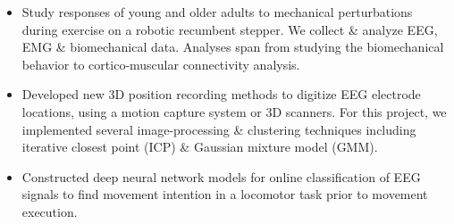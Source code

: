 \documentclass[10pt,letter,ragged2e]{altacv}
\begin{document}

\begin{fullwidth}
\makecvheader
\end{fullwidth}



\begin{itemize}
\item Study responses of young and older adults to mechanical perturbations during exercise on a robotic recumbent stepper. We collect \& analyze EEG, EMG \& biomechanical data. Analyses span from studying the biomechanical behavior to cortico-muscular connectivity analysis.
\item Developed new 3D position recording methods to digitize EEG electrode locations, using a motion capture system or 3D scanners. For this project, we implemented several image-processing \& clustering techniques including iterative closest point (ICP) \& Gaussian mixture model (GMM).
\item Constructed deep neural network models for online classification of EEG signals to find movement intention in a locomotor task prior to movement execution.
\end{itemize}
\end{document}
